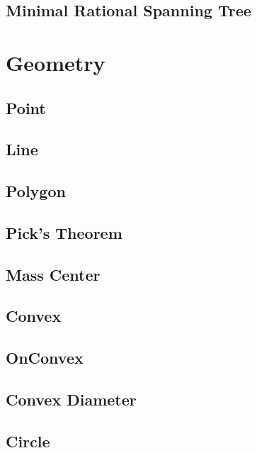 \documentclass[10pt,twocolumn,oneside]{article}
\begin{document}
    \subsection{Minimal Rational Spanning Tree}
    
    \section{Geometry}
    \subsection{Point}
    
    \subsection{Line}
    
    \subsection{Polygon}
    
    \subsection{Pick's Theorem}
    
    \subsection{Mass Center}
    
    \subsection{Convex}
    
    \subsection{OnConvex}
    
    \subsection{Convex Diameter}
    
    \subsection{Circle}
    
\end{document}
